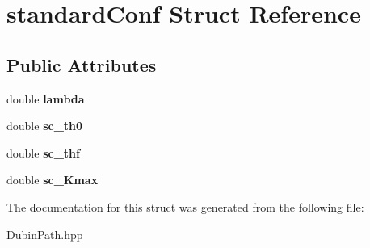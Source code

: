 \hypertarget{structstandard_conf}{}\section{standard\+Conf Struct Reference}
\label{structstandard_conf}
\subsection*{Public Attributes}
\begin{DoxyCompactItemize}
\item 
\mbox{\label{structstandard_conf_ac5a8976654eddd1c14b2aab5f4401943}} 
double {\bfseries lambda}
\item 
\mbox{\label{structstandard_conf_a105f1c9c8b50dc1f82ded42d04efeddb}} 
double {\bfseries sc\+\_\+th0}
\item 
\mbox{\label{structstandard_conf_a10bf9ad5cc1f29e5414bcad2d762273c}} 
double {\bfseries sc\+\_\+thf}
\item 
\mbox{\label{structstandard_conf_a394472a69fcea7d55ff5925a878e4d2d}} 
double {\bfseries sc\+\_\+\+Kmax}
\end{DoxyCompactItemize}


The documentation for this struct was generated from the following file\+:\begin{DoxyCompactItemize}
\item 
Dubin\+Path.\+hpp\end{DoxyCompactItemize}

